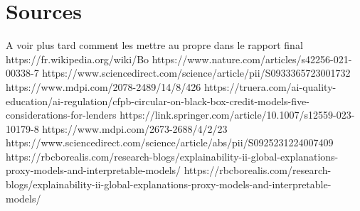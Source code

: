 \documentclass{article}
\begin{document}
\section{Sources}
A voir plus tard comment les mettre au propre dans le rapport final
https://fr.wikipedia.org/wiki/Bo%
https://www.nature.com/articles/s42256-021-00338-7
https://www.sciencedirect.com/science/article/pii/S0933365723001732
https://www.mdpi.com/2078-2489/14/8/426
https://truera.com/ai-quality-education/ai-regulation/cfpb-circular-on-black-box-credit-models-five-considerations-for-lenders
https://link.springer.com/article/10.1007/s12559-023-10179-8
https://www.mdpi.com/2673-2688/4/2/23
https://www.sciencedirect.com/science/article/abs/pii/S0925231224007409
https://rbcborealis.com/research-blogs/explainability-ii-global-explanations-proxy-models-and-interpretable-models/
https://rbcborealis.com/research-blogs/explainability-ii-global-explanations-proxy-models-and-interpretable-models/
\end{document}
